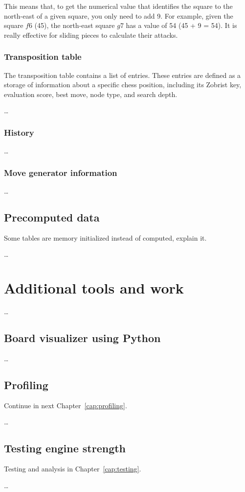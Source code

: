 \noindent This means that, to get the numerical value that identifies the square to the north-east of a given square, you only need to add 9. For example, given the square $f6$ (45), the north-east square $g7$ has a value of 54 (45 + 9 = 54). It is really effective for sliding pieces to calculate their attacks.

\subsubsection{Transposition table}

The transposition table contains a list of entries. These entries are defined as a storage of information about a specific chess position, including its Zobrist key, evaluation score, best move, node type, and search depth.

\ldots

\subsubsection{History}

\ldots

\subsubsection{Move generator information}

\ldots

\subsection{Precomputed data}

Some tables are memory initialized instead of computed, explain it.

\ldots

\section{Additional tools and work}

\ldots

\subsection{Board visualizer using Python}

\ldots

\subsection{Profiling}

Continue in next Chapter~\ref{cap:profiling}.

\ldots

\subsection{Testing engine strength}

Testing and analysis in Chapter~\ref{cap:testing}.

\ldots
